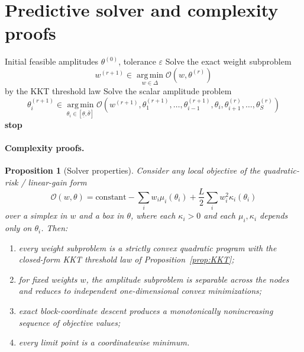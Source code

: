 \documentclass{article}
\newtheorem{proposition}[theorem]{Proposition}
\theoremstyle{definition}
\newcommand{\argmin}{\operatorname*{arg\,min}}
\begin{document}
\section{Predictive solver and complexity proofs}

\begin{algorithm}[ht]
\caption{Alternating local-control solver}
\label{alg:solver}
\begin{algorithmic}[1]
\Require Initial feasible amplitudes $\theta^{(0)}$, tolerance $\varepsilon$
    \State Solve the exact weight subproblem
    \[
    w^{(r+1)}\in \argmin_{w\in\Delta} \mathcal O(w,\theta^{(r)})
    \]
    \State by the KKT threshold law
        \State Solve the scalar amplitude problem
        \[
        \theta_i^{(r+1)}
        \in
        \argmin_{\theta_i\in[\underline\theta,\bar\theta]}
        \mathcal O(w^{(r+1)},\theta_1^{(r+1)},\dots,\theta_{i-1}^{(r+1)},\theta_i,\theta_{i+1}^{(r)},\dots,\theta_S^{(r)})
        \]
    \EndFor
        \State \textbf{stop}
    \EndIf
\EndFor
\end{algorithmic}
\end{algorithm}

\paragraph{Complexity proofs.}

\begin{proposition}[Solver properties]
\label{prop:solver}
Consider any local objective of the quadratic-risk / linear-gain form
\[
\mathcal O(w,\theta)
=
\text{constant}
-
\sum_i w_i \mu_i(\theta_i)
+
\frac{L}{2}\sum_i w_i^2 \kappa_i(\theta_i)
\]
over a simplex in $w$ and a box in $\theta$, where each $\kappa_i>0$ and each
$\mu_i,\kappa_i$ depends only on $\theta_i$. Then:
\begin{enumerate}[leftmargin=2em]
\item every weight subproblem is a strictly convex quadratic program with the closed-form KKT threshold law of Proposition~\ref{prop:KKT};
\item for fixed weights $w$, the amplitude subproblem is separable across the nodes and reduces to independent one-dimensional convex minimizations;
\item exact block-coordinate descent produces a monotonically nonincreasing sequence of objective values;
\item every limit point is a coordinatewise minimum.
\end{enumerate}
\end{proposition}
\end{document}
